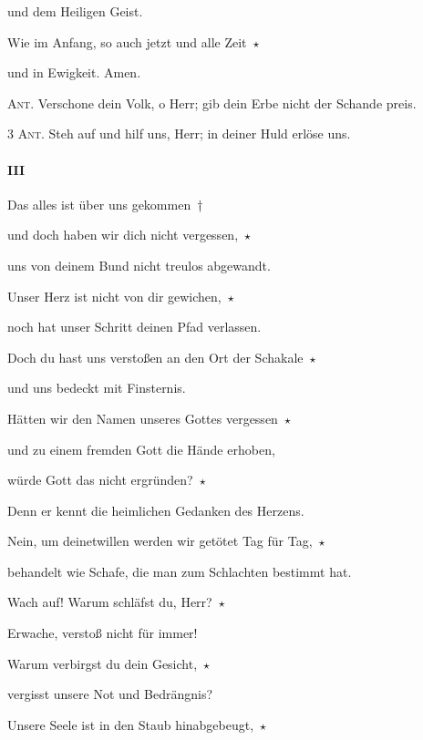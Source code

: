 und dem Heiligen Geist.

\noindent Wie im Anfang, so auch jetzt und alle Zeit~$\star$~\nopagebreak

und in Ewigkeit. Amen.

\vspace{10pt}

\noindent \textsc{Ant.} Verschone dein Volk, o Herr; gib dein Erbe nicht der Schande preis. \vspace{10pt}

\noindent \textsc{3 Ant.} Steh auf und hilf uns, Herr; in deiner Huld erlöse uns.

\paragraph{III}

\noindent Das alles ist über uns gekommen~†~\nopagebreak

und doch haben wir dich nicht vergessen,~$\star$~\nopagebreak

uns von deinem Bund nicht treulos abgewandt.

\noindent Unser Herz ist nicht von dir gewichen,~$\star$~\nopagebreak

noch hat unser Schritt deinen Pfad verlassen.

\noindent Doch du hast uns verstoßen an den Ort der Schakale~$\star$~\nopagebreak

und uns bedeckt mit Finsternis.

\noindent Hätten wir den Namen unseres Gottes vergessen~$\star$~\nopagebreak

und zu einem fremden Gott die Hände erhoben,

\noindent würde Gott das nicht ergründen?~$\star$~\nopagebreak

Denn er kennt die heimlichen Gedanken des Herzens.

\noindent Nein, um deinetwillen werden wir getötet Tag für Tag,~$\star$~\nopagebreak

behandelt wie Schafe, die man zum Schlachten bestimmt hat. 

 \noindent Wach auf! Warum schläfst du, Herr?~$\star$~\nopagebreak

Erwache, verstoß nicht für immer! 

 \noindent Warum verbirgst du dein Gesicht,~$\star$~\nopagebreak

vergisst unsere Not und Bedrängnis? 

 \noindent Unsere Seele ist in den Staub hinabgebeugt,~$\star$~\nopagebreak

